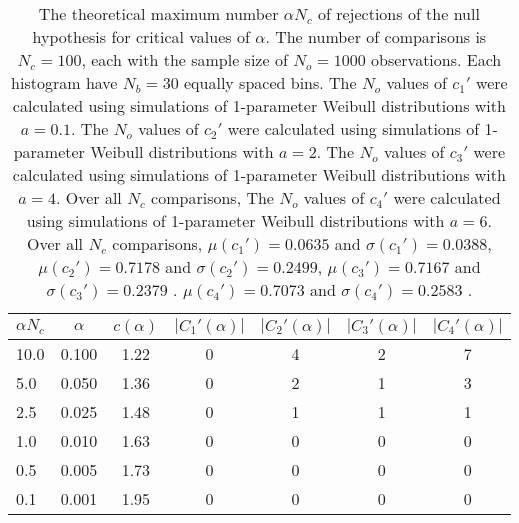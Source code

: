 \begin{table}[h!]
\begin{center}
\begin{tabular}{| l | c | c | c | c | c | c |}\hline
$\alpha N_c$ & $\alpha$ & $c(\alpha)$ & $|C_1'(\alpha)|$ & $|C_2'(\alpha)|$ & $|C_3'(\alpha)|$ & $|C_4'(\alpha)|$ \\\hline
10.0 & 0.100 & 1.22 & 0 & 4 & 2 & 7 \\\hline
5.0 & 0.050 & 1.36 & 0 & 2 & 1 & 3 \\\hline
2.5 & 0.025 & 1.48 & 0 & 1 & 1 & 1 \\\hline
1.0 & 0.010 & 1.63 & 0 & 0 & 0 & 0 \\\hline
0.5 & 0.005 & 1.73 & 0 & 0 & 0 & 0 \\\hline
0.1 & 0.001 & 1.95 & 0 & 0 & 0 & 0 \\\hline
\end{tabular}
\caption{The theoretical maximum number $\alpha N_c$ of rejections
of the null hypothesis for critical values of $\alpha$.
The number of comparisons is $N_c=100$,
each with the sample size of $N_o=1000$ observations.
Each histogram have $N_b=30$ equally spaced bins.
The $N_o$ values of $c_1'$ were calculated using simulations of
 1-parameter Weibull distributions with $a=0.1$.
The $N_o$ values of $c_2'$ were calculated using simulations of
 1-parameter Weibull distributions with $a=2$.
The $N_o$ values of $c_3'$ were calculated using simulations of
 1-parameter Weibull distributions with $a=4$.
Over all $N_c$ comparisons,
The $N_o$ values of $c_4'$ were calculated using simulations of
 1-parameter Weibull distributions with $a=6$.
Over all $N_c$ comparisons,
 $\mu(c_1')=0.0635$ and $\sigma(c_1')=0.0388$,
 $\mu(c_2')=0.7178$ and $\sigma(c_2')=0.2499$,
 $\mu(c_3')=0.7167$ and $\sigma(c_3')=0.2379$ .
 $\mu(c_4')=0.7073$ and $\sigma(c_4')=0.2583$ .
}
\end{center}
\end{table}